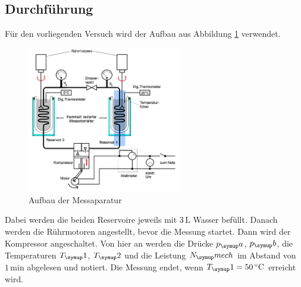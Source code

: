 \subsection{Durchführung}
Für den vorliegenden Versuch wird der Aufbau aus Abbildung \ref{fig:2} verwendet.
\begin{figure}
  \centering
  \includegraphics[width=0.6\textwidth]{Bilder/aufbau.jpg}
  \caption{Aufbau der Messaparatur \,\cite{206}}
  \label{fig:2}
\end{figure}
Dabei werden die beiden Reservoire jeweils mit $3 \,\si{\liter}$ Wasser befüllt. Danach
werden die Rührmotoren angestellt, bevor die Messung startet. Dann wird der Kompressor
angeschaltet. Von hier an werden die Drücke $p_\su{a}$, $p_\su{b}$, die Temperaturen
$T_\su{1}$, $T_\su{2}$ und die Leistung $N_\su{mech}$ im Abstand von $1\,\si{\minute}$
abgelesen und notiert. Die Messung endet, wenn $T_\su{1} = 50\,\si{\celsius}$ erreicht wird.
